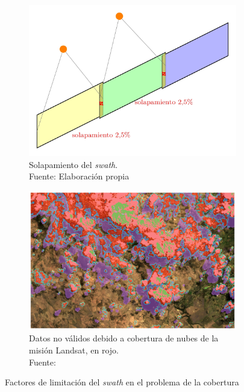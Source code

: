 \begin{figure}[H]
    \centering
    \begin{subfigure}[t]{0.45\textwidth}
        \centering
        \includegraphics[width=\linewidth]{4.Payload/TFG_Tikz-1.jpg}
        \caption{Solapamiento del \textit{swath}. \\ Fuente: Elaboración propia}
        \label{fig:img3}
    \end{subfigure}
    \hspace{0.05\textwidth}
    \begin{subfigure}[t]{0.45\textwidth}
        \centering
        \includegraphics[width=\linewidth]{4.Payload/cloudcov.png}
        \caption{Datos no válidos debido a cobertura de nubes de la misión Landsat, en rojo. \\ Fuente: \cite{osullivan2023removing}}
        \label{fig:img4}
    \end{subfigure}
    \caption{Factores de limitación del \textit{swath} en el problema de la cobertura}
\end{figure}


